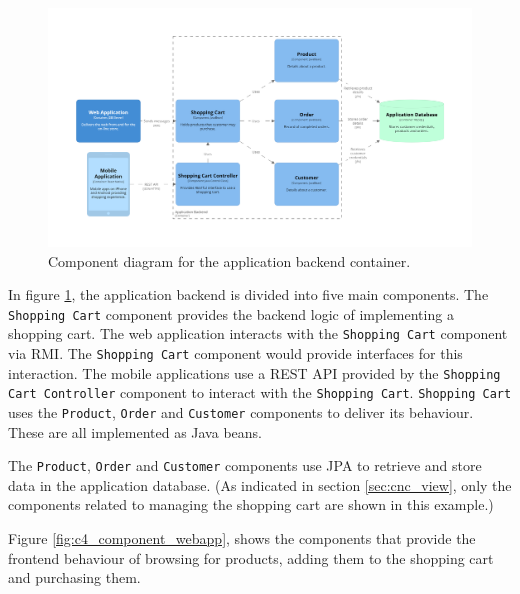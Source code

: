 \begin{figure}[h!]
    \centering
    \begin{adjustwidth}{-8.5mm}{-8.5mm}
        \includegraphics[trim=190 185 197 198,clip,width=0.96\paperwidth]{images/c4/appbackend_component_diagram.png}
    \end{adjustwidth}
    \caption{Component diagram for the application backend container.}
    \label{fig:c4_component_appbackend}
\end{figure}

In figure \ref{fig:c4_component_appbackend}, the application backend is divided into five main components.
The \texttt{Shopping Cart} component provides the backend logic of implementing a shopping cart.
The web application interacts with the \texttt{Shopping Cart} component via RMI.
The \texttt{Shopping Cart} component would provide interfaces for this interaction.
The mobile applications use a REST API provided by the \texttt{Shopping Cart Controller} component to interact with the \texttt{Shopping Cart}.
\texttt{Shopping Cart} uses the \texttt{Product}, \texttt{Order} and \texttt{Customer} components to deliver its behaviour.
These are all implemented as Java beans.

\filbreak
\noindent
The \texttt{Product}, \texttt{Order} and \texttt{Customer} components use JPA to retrieve and store data in the application database.
(As indicated in section \ref{sec:cnc_view}, only the components related to managing the shopping cart are shown in this example.)

Figure \ref{fig:c4_component_webapp}, shows the components that provide the frontend behaviour
of browsing for products, adding them to the shopping cart and purchasing them.

